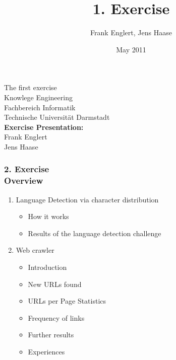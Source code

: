 \documentclass[accentcolor=tud1b,colorbacktitle,inverttitle,landscape,presentation,t]{tudbeamer}
\newcommand{\myframetitle}[2]{\frametitle{#1 \\[.2cm] \small #2}}
\begin{document}
\title[MGA]{\large 1. Exercise}

\author{Frank Englert, Jens Haase}


\date{May 2011}

\begin{titleframe}
\begin{center}
\color{tudtextaccent} \large The first exercise\\[.5cm]
\normalcolor \normalsize Knowlege Engineering \\
Fachbereich Informatik \\
Technische Universität Darmstadt\\[.5cm]

\textbf{Exercise Presentation:}\\
Frank Englert\\
Jens Haase
\end{center}

\end{titleframe} 

\begin{frame}[c]
	\myframetitle{2. Exercise}{Overview}
\begin{enumerate}
  \item Language Detection via character distribution
  \begin{itemize}
  \item How it works
  \item Results of the language detection challenge
\end{itemize}
  \item Web crawler
  \begin{itemize}
  \item Introduction
  \item New URLs found
  \item URLs per Page Statistics
  \item Frequency of links
  \item Further results
  \item Experiences
\end{itemize}
\end{enumerate}
\end{frame}



\end{document}
